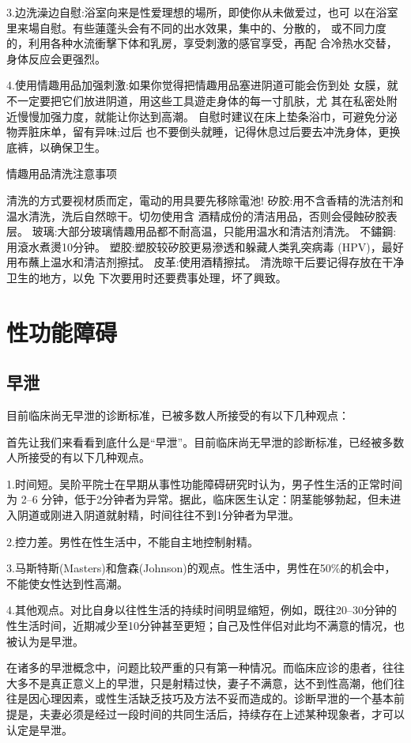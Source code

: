 \documentclass[12pt,UTF8]{ctexbook}
\begin{document}
3.边洗澡边自慰:浴室向来是性爱理想的場所，即使你从未做爱过，也可
以在浴室里来場自慰。有些蓮蓬头会有不同的出水效果，集中的、分散的，
或不同力度的，利用各种水流衝擊下体和乳房，享受刺激的感官享受，再配
合冷热水交替，身体反应会更强烈。

4.使用情趣用品加强刺激:如果你觉得把情趣用品塞进阴道可能会伤到处
女膜，就不一定要把它们放进阴道，用这些工具遊走身体的每一寸肌肤，尤
其在私密处附近慢慢加强力度，就能让你达到高潮。
自慰时建议在床上垫条浴巾，可避免分泌物弄脏床单，留有异味;过后
也不要倒头就睡，记得休息过后要去冲洗身体，更换底裤，以确保卫生。

情趣用品清洗注意事项

清洗的方式要视材质而定，電动的用具要先移除電池!
矽胶:用不含香精的洗洁剂和温水清洗，洗后自然晾干。切勿使用含
酒精成份的清洁用品，否则会侵蝕矽胶表层。
玻璃:大部分玻璃情趣用品都不耐高温，只能用温水和清洁剂清洗。
不鏽鋼:用滾水煮燙10分钟。
塑胶:塑胶较矽胶更易滲透和躲藏人类乳突病毒
(HPV)，最好用布蘸上温水和清洁剂擦拭。
皮革:使用酒精擦拭。
清洗晾干后要记得存放在干净卫生的地方，以免
下次要用时还要费事处理，坏了興致。

\part{性功能障碍}

\chapter{早泄}

目前临床尚无早泄的诊断标准，已被多数人所接受的有以下几种观点：

首先让我们来看看到底什么是“早泄”。目前临床尚无早泄的診断标准，已经被多数人所接受的有以下几种观点。

1.时间短。吴阶平院士在早期从事性功能障碍研究时认为，男子性生活的正常时间为 2--6 分钟，低于2分钟者为异常。据此，临床医生认定：阴茎能够勃起，但未进入阴道或刚进入阴道就射精，时间往往不到1分钟者为早泄。

2.控力差。男性在性生活中，不能自主地控制射精。

3.马斯特斯(Masters)和詹森(Johnson)的观点。性生活中，男性在50\%的机会中，不能使女性达到性高潮。

4.其他观点。对比自身以往性生活的持续时间明显缩短，例如，既往20--30分钟的性生活时间，近期减少至10分钟甚至更短；自己及性伴侣对此均不满意的情况，也被认为是早泄。

在诸多的早泄概念中，问题比较严重的只有第一种情况。而临床应诊的患者，往往大多不是真正意义上的早泄，只是射精过快，妻子不满意，达不到性高潮，他们往往是因心理因素，或性生活缺乏技巧及方法不妥而造成的。诊断早泄的一个基本前提是，夫妻必须是经过一段时间的共同生活后，持续存在上述某种现象者，才可以认定是早泄。
\end{document}
